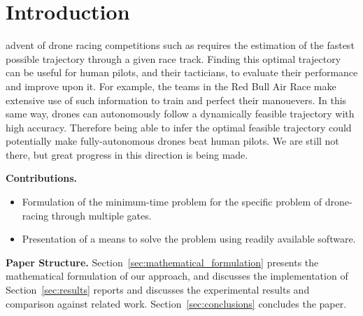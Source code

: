 
\section{Introduction}
\label{sec:introduction}

  advent of drone racing competitions such as  requires the estimation of the fastest possible trajectory through a given race track.
 Finding this optimal trajectory can be useful for human pilots, and their tacticians, to evaluate their performance and improve upon it.
 For example, the teams in the Red Bull Air Race  make extensive use of such information to train and perfect their manouevers.
 In this same way, drones can autonomously follow a dynamically feasible trajectory with high accuracy.
 Therefore being able to infer the optimal feasible trajectory could potentially make fully-autonomous drones beat human pilots.
 We are still not there, but great progress in this direction is being made.

{\bf Contributions.}
\begin{itemize}
  \item Formulation of the minimum-time problem for the specific problem of drone-racing through multiple gates.
  \item Presentation of a means to solve the problem using readily available software.
\end{itemize}

{\bf Paper Structure.}
Section~\ref{sec:mathematical_formulation} presents the mathematical formulation of our approach, and discusses the implementation of
Section~\ref{sec:results} reports and discusses the experimental results and comparison against related work. Section~\ref{sec:conclusions} concludes the paper.
